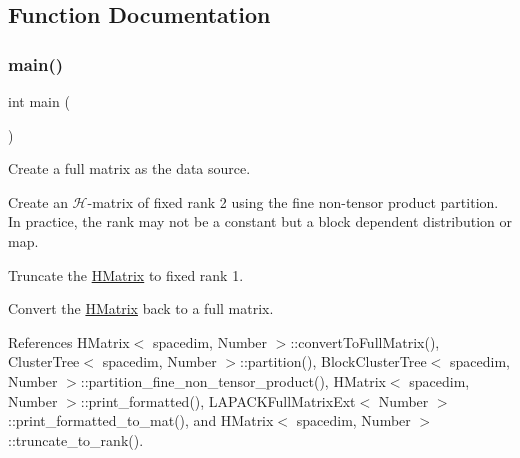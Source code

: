 \subsection{Function Documentation}
\mbox{\label{hmatrix-truncate-to-fixed-rank_8cc_ae66f6b31b5ad750f1fe042a706a4e3d4}} 
\subsubsection{\texorpdfstring{main()}{main()}}
{\footnotesize\ttfamily int main (\begin{DoxyParamCaption}{ }\end{DoxyParamCaption})}

Create a full matrix as the data source.

Create an $\mathcal{H}$-\/matrix of fixed rank 2 using the fine non-\/tensor product partition. In practice, the rank may not be a constant but a block dependent distribution or map.

Truncate the \hyperlink{classHMatrix}{H\+Matrix} to fixed rank 1.

Convert the \hyperlink{classHMatrix}{H\+Matrix} back to a full matrix.

References H\+Matrix$<$ spacedim, Number $>$\+::convert\+To\+Full\+Matrix(), Cluster\+Tree$<$ spacedim, Number $>$\+::partition(), Block\+Cluster\+Tree$<$ spacedim, Number $>$\+::partition\+\_\+fine\+\_\+non\+\_\+tensor\+\_\+product(), H\+Matrix$<$ spacedim, Number $>$\+::print\+\_\+formatted(), L\+A\+P\+A\+C\+K\+Full\+Matrix\+Ext$<$ Number $>$\+::print\+\_\+formatted\+\_\+to\+\_\+mat(), and H\+Matrix$<$ spacedim, Number $>$\+::truncate\+\_\+to\+\_\+rank().

